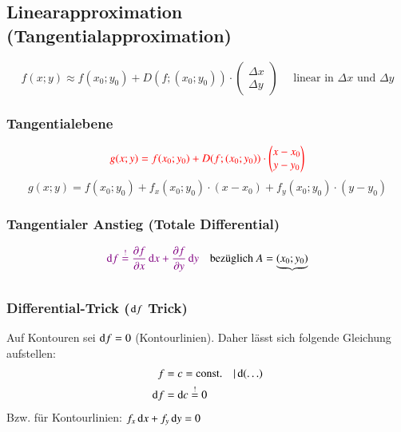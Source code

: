 

\subsection{Linearapproximation (Tangentialapproximation)}
\[
    f(x;y) \approx f(x_{0}; y_{0}) + D(f;(x_{0}; y_{0}))\cdot \begin{pmatrix}
        \Delta x\\
        \Delta y
    \end{pmatrix}
    \quad\text{ linear in $\Delta x$ und $\Delta y$}
\]


\subsubsection{Tangentialebene}
\[
    {\color{red}g(x; y) = f(x_{0}; y_{0}) + D(f;(x_{0}; y_{0}))\cdot \begin{pmatrix}
        x - x_{0}\\
        y - y_{0}
    \end{pmatrix}}
\]
\[
    g(x;y)=f(x_0;y_0)+f_x(x_0;y_0)\cdot(x-x_0)+f_y(x_0;y_0)\cdot(y-y_0)
\]

\subsubsection{Tangentialer Anstieg (Totale Differential)}
\[
    \cvt{\diff f \overset{!}{=} 
        \frac{\partial f}{\partial \tikznode{ptx}{x}}\diff x + 
        \frac{\partial f}{\partial \tikznode{pty}{y}}\diff y} 
        \quad \text{bezüglich } A=\underbrace{(x_{0}; y_{0})}_{\tikznode{axy}{}}
\]


\subsubsection{Differential-Trick (\texorpdfstring{$\mathop{} \! \mathrm{d} f$}{df} Trick)}
Auf Kontouren sei $\mathop{} \! \mathrm{d} f = 0$ (Kontourlinien). Daher lässt sich folgende Gleichung aufstellen:
\[
\begin{aligned}
    f &= c = \mathrm{const.} \quad | \mathop{} \! \mathrm{d}(\ldots)\\
    \mathop{} \! \mathrm{d} f &= \mathop{} \! \mathrm{d} c \overset{!}{=} 0
\end{aligned}
\]
Bzw. für Kontourlinien: $f_{x}\mathop{} \! \mathrm{d} x + f_{y}\mathop{} \! \mathrm{d} y = 0$


